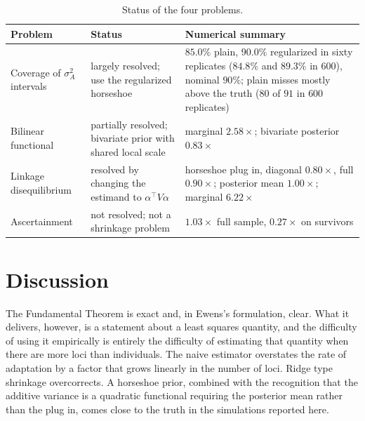 \begin{table}[t]
\centering
\small
\begin{tabularx}{\textwidth}{>{\raggedright\arraybackslash}p{1.2in}>{\raggedright\arraybackslash}X>{\raggedright\arraybackslash}X}
\toprule
Problem & Status & Numerical summary \\
\midrule
Coverage of $\sigma^2_A$ intervals & largely resolved; use the regularized horseshoe & $85.0\%$ plain, $90.0\%$ regularized in sixty replicates ($84.8\%$ and $89.3\%$ in $600$), nominal $90\%$; plain misses mostly above the truth ($80$ of $91$ in $600$ replicates) \\
Bilinear functional & partially resolved; bivariate prior with shared local scale & marginal $2.58\times$; bivariate posterior $0.83\times$ \\
Linkage disequilibrium & resolved by changing the estimand to $\alpha^\top V\alpha$ & horseshoe plug in, diagonal $0.80\times$, full $0.90\times$; posterior mean $1.00\times$; marginal $6.22\times$ \\
Ascertainment & not resolved; not a shrinkage problem & $1.03\times$ full sample, $0.27\times$ on survivors \\
\bottomrule
\end{tabularx}
\caption{Status of the four problems.}
\label{hs:tab:open}
\end{table}

\section{Discussion}

The Fundamental Theorem is exact and, in Ewens's formulation, clear. What it delivers, however, is a statement about a least squares quantity, and the difficulty of using it empirically is entirely the difficulty of estimating that quantity when there are more loci than individuals. The naive estimator overstates the rate of adaptation by a factor that grows linearly in the number of loci. Ridge type shrinkage overcorrects. A horseshoe prior, combined with the recognition that the additive variance is a quadratic functional requiring the posterior mean rather than the plug in, comes close to the truth in the simulations reported here.

